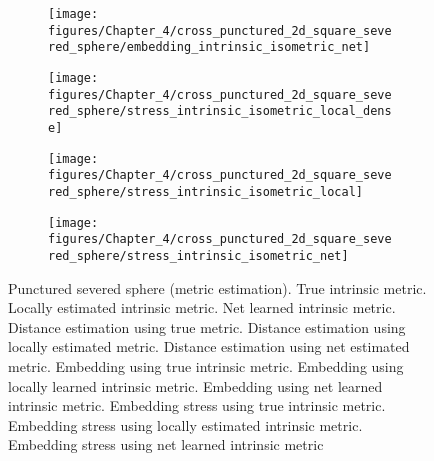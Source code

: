\begin{figure}[h]
\begin{centering}
\begin{subfigure}[b]{0.32\linewidth}
					\caption{\label{fig:1h}}
			\end{subfigure}\hfill
			\begin{subfigure}[b]{0.32\linewidth}
					\texttt{[image: figures/Chapter\_4/cross\_punctured\_2d\_square\_severed\_sphere/embedding\_intrinsic\_isometric\_net]}
					\caption{\label{fig:1i}}
			\end{subfigure}
		\end{centering}
		\begin{centering}
			\begin{subfigure}[b]{0.32\linewidth}
					\texttt{[image: figures/Chapter\_4/cross\_punctured\_2d\_square\_severed\_sphere/stress\_intrinsic\_isometric\_local\_dense]}
					\caption{\label{fig:1j}}
			\end{subfigure}\hfill
			\begin{subfigure}[b]{0.32\linewidth}
					\texttt{[image: figures/Chapter\_4/cross\_punctured\_2d\_square\_severed\_sphere/stress\_intrinsic\_isometric\_local]}
					\caption{\label{fig:1k}}
			\end{subfigure}\hfill
			\begin{subfigure}[b]{0.32\linewidth}
					\texttt{[image: figures/Chapter\_4/cross\_punctured\_2d\_square\_severed\_sphere/stress\_intrinsic\_isometric\_net]}
					\caption{\label{fig:1l}}
			\end{subfigure}
		\end{centering}
	
	\caption{Punctured severed sphere (metric estimation).
		\protect{} True intrinsic metric.
		\protect{} Locally estimated intrinsic metric.
		\protect{} Net learned intrinsic metric.
		\protect{} Distance estimation using true metric.
		\protect{} Distance estimation using locally estimated metric.
		\protect{} Distance estimation using net estimated metric.
		\protect{} Embedding using true intrinsic metric.
		\protect{} Embedding using locally learned intrinsic metric.
		\protect{} Embedding using net learned intrinsic metric.
		\protect{} Embedding stress using true intrinsic metric.
		\protect{} Embedding stress using locally estimated intrinsic metric.
		\protect{} Embedding stress using net learned intrinsic metric}
	
	
	\label{fig:metric_punctured_severed_sphere}
	\end{figure}

